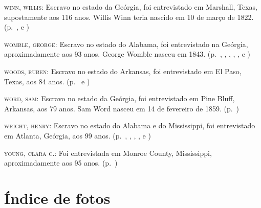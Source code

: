 \begin{Parskip}
\textsc{winn, willis:} Escravo no estado da Geórgia, foi entrevistado em
Marshall, Texas, supostamente aos 116 anos. Willis Winn teria nascido em
10 de março de 1822. (p.~\pageref{ref303}, \pageref{ref304} e \pageref{ref305})

\textsc{womble, george:} Escravo no estado do Alabama, foi entrevistado
na Geórgia, aproximadamente aos 93 anos. George Womble nasceu em 1843. (p.~\pageref{ref306}, \pageref{ref307}, \pageref{ref308}, \pageref{ref309}, \pageref{ref310}, \pageref{ref311} e \pageref{ref312})

\textsc{woods, ruben:} Escravo no estado do Arkansas, foi entrevistado
em El Paso, Texas, aos 84 anos. (p.~\pageref{ref313} e \pageref{ref314}) 

\textsc{word, sam:} Escravo no estado da Geórgia, foi entrevistado em
Pine Bluff, Arkansas, aos 79 anos. Sam Word nasceu em 14 de fevereiro de 1859. (p.~\pageref{ref315})

\textsc{wright, henry:} Escravo no estado do Alabama e do Mississippi,
foi entrevistado em Atlanta, Geórgia, aos 99 anos. (p.~\pageref{ref316}, \pageref{ref317}, \pageref{ref318}, \pageref{ref319}, \pageref{ref320} e \pageref{ref321})

\textsc{young, clara c.:} Foi entrevistada em Monroe County,
Mississippi, aproximadamente aos 95 anos. (p.~\pageref{ref322})
\end{Parskip}

\section{Índice de fotos}

